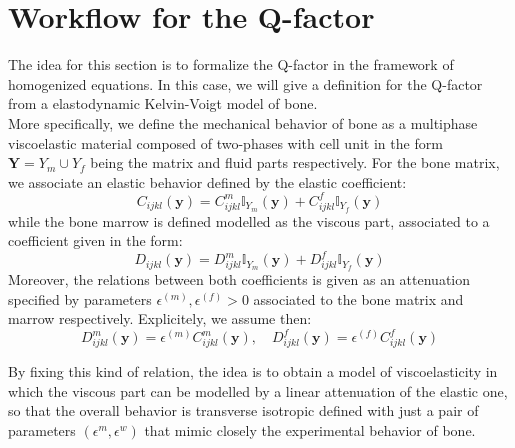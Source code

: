 \section{Workflow for the Q-factor}
The idea for this section is to formalize the Q-factor in the framework of homogenized equations.
In this case, we will give a definition for the Q-factor from a elastodynamic Kelvin-Voigt model of bone.\\
More specifically, we define the mechanical behavior of bone as a multiphase viscoelastic material composed of two-phases with cell unit in the form $\mathbf{Y} = Y_{m} \cup Y_{f}$ being the matrix and fluid parts respectively.
For the bone matrix, we associate an elastic behavior defined by the elastic coefficient:
\begin{equation*}
    C_{ijkl}(\mathbf{y}) = C_{ijkl}^m \mathbb{I}_{Y_m}(\mathbf{y}) + C_{ijkl}^f \mathbb{I}_{Y_f}(\mathbf{y})
\end{equation*}
while the bone marrow is defined modelled as the viscous part, associated to a coefficient given in the form:
\begin{equation*}
    D_{ijkl}(\mathbf{y}) =  D_{ijkl}^m \mathbb{I}_{Y_m}(\mathbf{y}) + D_{ijkl}^f \mathbb{I}_{Y_f}(\mathbf{y})
\end{equation*}
Moreover, the relations between both coefficients is given as an attenuation specified by parameters $\epsilon^{(m)}, \epsilon^{(f)} >0$ associated to the bone matrix and marrow respectively. Explicitely, we assume then:
\begin{equation*}
    D_{ijkl}^m(\mathbf{y}) = \epsilon^{(m)} C_{ijkl}^m(\mathbf{y}) , \quad D_{ijkl}^f (\mathbf{y}) = \epsilon^{(f)} C_{ijkl}^f(\mathbf{y})
\end{equation*}


\begin{rem}
By fixing this kind of relation, the idea is to obtain a model of viscoelasticity in which the viscous part can be modelled by a linear attenuation of the elastic one, so that the overall behavior is transverse isotropic defined with just a pair of parameters $(\epsilon^m, \epsilon^w)$ that mimic closely the experimental behavior of bone.
\end{rem}


